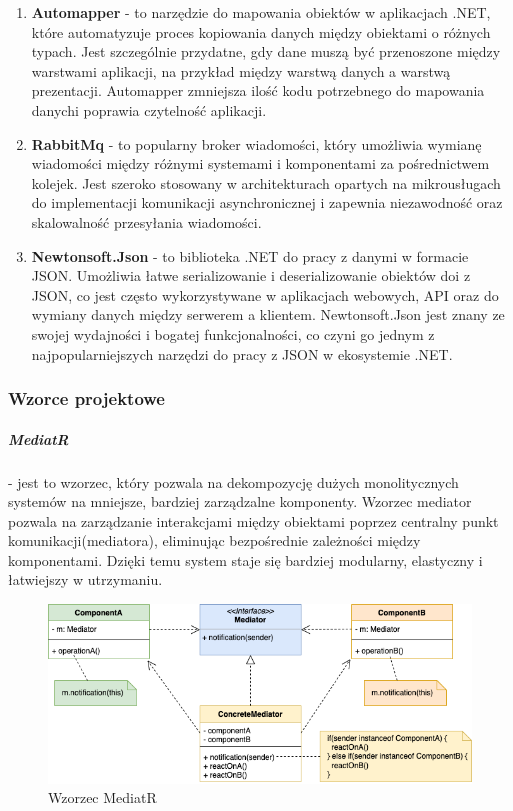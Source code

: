 \begin{enumerate}
\item {\bf Automapper} -  to narzędzie do mapowania obiektów w aplikacjach .NET, które automatyzuje proces kopiowania danych między obiektami o różnych typach. Jest szczególnie przydatne, gdy dane muszą być przenoszone między warstwami aplikacji, na przykład między warstwą danych a warstwą prezentacji. Automapper zmniejsza ilość kodu potrzebnego do mapowania danych\linebreak i poprawia czytelność aplikacji.

\item {\bf RabbitMq} - to popularny broker wiadomości, który umożliwia wymianę wiadomości między różnymi systemami i komponentami za pośrednictwem kolejek. Jest szeroko stosowany w architekturach opartych na mikrousługach do implementacji komunikacji asynchronicznej i zapewnia niezawodność oraz skalowalność przesyłania wiadomości.

\item {\bf Newtonsoft.Json} - to biblioteka .NET do pracy z danymi w formacie JSON. Umożliwia łatwe serializowanie i deserializowanie obiektów do\linebreak i z JSON, co jest często wykorzystywane w aplikacjach webowych, API oraz do wymiany danych między serwerem a klientem. Newtonsoft.Json jest znany ze swojej wydajności i bogatej funkcjonalności, co czyni go jednym z najpopularniejszych narzędzi do pracy z JSON w ekosystemie .NET.

\end{enumerate}

\subsubsection{Wzorce projektowe}

\subparagraph{MediatR} - jest to wzorzec, który pozwala na dekompozycję dużych monolitycznych systemów na mniejsze, bardziej zarządzalne komponenty. Wzorzec mediator pozwala na zarządzanie interakcjami między obiektami poprzez centralny punkt komunikacji(mediatora), eliminując bezpośrednie zależności między komponentami. Dzięki temu system staje się bardziej modularny, elastyczny i łatwiejszy w utrzymaniu. 

\begin{figure}[H]
    \centering
    \includegraphics[width=1\linewidth]{Obrazy/mediatR.png}
    \caption{Wzorzec MediatR}
    \label{fig:enter-label}
\end{figure}

